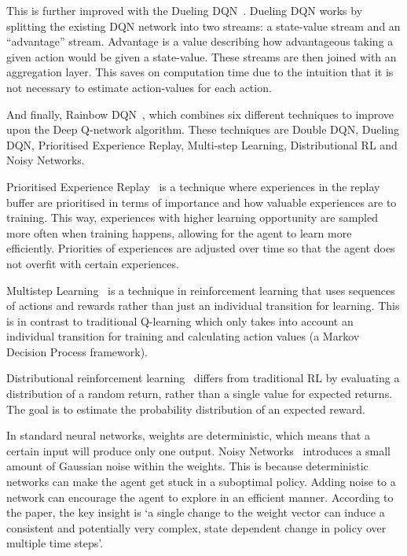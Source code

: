 \documentclass[12pt,a4paper]{article}
\begin{document}
    This is further improved with the Dueling DQN~\citep{wang16}.
    Dueling DQN works by splitting the existing DQN network into two streams: a state-value stream and an ``advantage'' stream.
    Advantage is a value describing how advantageous taking a given action would be given a state-value.
    These streams are then joined with an aggregation layer.
    This saves on computation time due to the intuition that it is not necessary to estimate action-values for each action.

    And finally, Rainbow DQN~\citep{hessel17}, which combines six different techniques to improve upon the Deep Q-network algorithm.
    These techniques are Double DQN, Dueling DQN, Prioritised Experience Replay,
    Multi-step Learning, Distributional RL and Noisy Networks.

    Prioritised Experience Replay~\citep{schaul16} is a technique where experiences in the replay buffer are prioritised in terms of importance and how valuable experiences are to training.
    This way, experiences with higher learning opportunity are sampled more often when training happens, allowing for the agent to learn more efficiently.
    Priorities of experiences are adjusted over time so that the agent does not overfit with certain experiences.

    Multistep Learning~\citep[chap.~7.1]{sutton18} is a technique in reinforcement learning that uses sequences of actions and rewards rather than just an individual transition for learning.
    This is in contrast to traditional Q-learning which only takes into account an individual transition for training and calculating action values (a Markov Decision Process framework).

    Distributional reinforcement learning~\citep{bellemare17} differs from traditional RL by evaluating a distribution of a random return, rather than a single value for expected returns.
    The goal is to estimate the probability distribution of an expected reward.

    In standard neural networks, weights are deterministic, which means that a certain input will produce only one output.
    Noisy Networks~\citep{fortunato19} introduces a small amount of Gaussian noise within the weights.
    This is because deterministic networks can make the agent get stuck in a suboptimal policy.
    Adding noise to a network can encourage the agent to explore in an efficient manner.
    According to the paper, the key insight is `a single change to the weight vector can induce a consistent and potentially very complex, state dependent change in policy over multiple time steps'.
\end{document}
